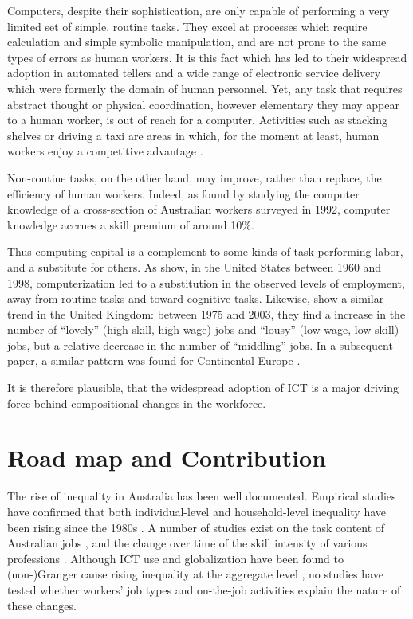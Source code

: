 Computers, despite their sophistication, are only capable of performing a very limited set of simple, routine tasks. They excel at processes which require calculation and simple symbolic manipulation, and are not prone to the same types of errors as human workers. It is this fact which has led to their widespread adoption in automated tellers and a wide range of electronic service delivery which were formerly the domain of human personnel. Yet, any task that requires abstract thought or physical coordination, however elementary they may appear to a human worker, is out of reach for a computer. Activities such as stacking shelves or driving a taxi are areas in which, for the moment at least, human workers enjoy a competitive advantage \citet{Levy2003}. 

Non-routine tasks, on the other hand, may improve, rather than replace, the efficiency of human workers. Indeed, as \citet{Borland2004} found by studying the computer knowledge of a cross-section of Australian workers surveyed in 1992, computer knowledge accrues a skill premium of around 10\%.

Thus computing capital is a complement to some kinds of task-performing labor, and a substitute for others. As \citet{Levy2003} show, in the United States between 1960 and 1998, computerization led to a substitution in the observed levels of employment, away from routine tasks and toward cognitive tasks. Likewise, \citet{Goos2007} show a similar trend in the United Kingdom: between 1975 and 2003, they find a increase in the number of ``lovely'' (high-skill, high-wage) jobs and ``lousy'' (low-wage, low-skill) jobs, but a relative decrease in the number of ``middling'' jobs. In a subsequent paper, a similar pattern was found for Continental Europe \citep{Goos2009}.

It is therefore plausible, that the widespread adoption of ICT is a major driving force behind compositional changes in the workforce. 

\section{Road map and Contribution}

The rise of inequality in Australia has been well documented. Empirical studies have confirmed that both individual-level and household-level inequality have been rising since the 1980s \citep{Borland1999,Leigh2005,Leigh2013,Gaston2009}. A number of studies exist on the task content of Australian jobs \citep{Esposto2012a}, and the change over time of the skill intensity of various professions \citep{Esposto2012, Esposto2012a}. Although ICT use and globalization have been found to (non-)Granger cause rising inequality at the aggregate level \citep{Gaston2009}, no studies have tested whether workers' job types and on-the-job activities explain the nature of these changes.

